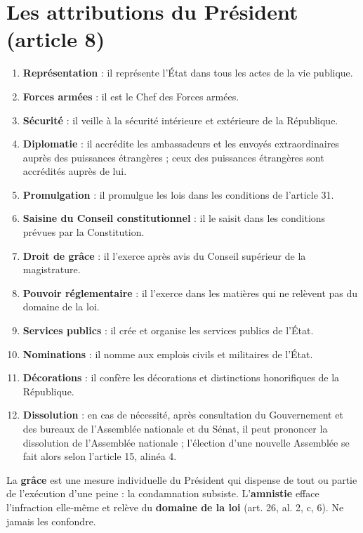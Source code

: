 \documentclass[11pt,a4paper,oneside]{report}
\begin{document}
\section{Les attributions du Président (article 8)}
\begin{enumerate}
  \item \textbf{Représentation} : il représente l'État dans tous les actes de la vie publique.
  \item \textbf{Forces armées} : il est le Chef des Forces armées.
  \item \textbf{Sécurité} : il veille à la sécurité intérieure et extérieure de la République.
  \item \textbf{Diplomatie} : il accrédite les ambassadeurs et les envoyés extraordinaires auprès des puissances étrangères ; ceux des puissances étrangères sont accrédités auprès de lui.
  \item \textbf{Promulgation} : il promulgue les lois dans les conditions de l'article 31.
  \item \textbf{Saisine du Conseil constitutionnel} : il le saisit dans les conditions prévues par la Constitution.
  \item \textbf{Droit de grâce} : il l'exerce après avis du Conseil supérieur de la magistrature.
  \item \textbf{Pouvoir réglementaire} : il l'exerce dans les matières qui ne relèvent pas du domaine de la loi.
  \item \textbf{Services publics} : il crée et organise les services publics de l'État.
  \item \textbf{Nominations} : il nomme aux emplois civils et militaires de l'État.
  \item \textbf{Décorations} : il confère les décorations et distinctions honorifiques de la République.
  \item \textbf{Dissolution} : en cas de nécessité, après consultation du Gouvernement et des bureaux de l'Assemblée nationale et du Sénat, il peut prononcer la dissolution de l'Assemblée nationale ; l'élection d'une nouvelle Assemblée se fait alors selon l'article 15, alinéa 4.
\end{enumerate}
\begin{keybox}[title={À retenir — Grâce et amnistie}]
La \textbf{grâce} est une mesure individuelle du Président qui dispense de tout ou partie de l'exécution d'une peine : la condamnation subsiste. L'\textbf{amnistie} efface l'infraction elle-même et relève du \textbf{domaine de la loi} (art. 26, al. 2, c, 6). Ne jamais les confondre.
\end{keybox}
\end{document}

